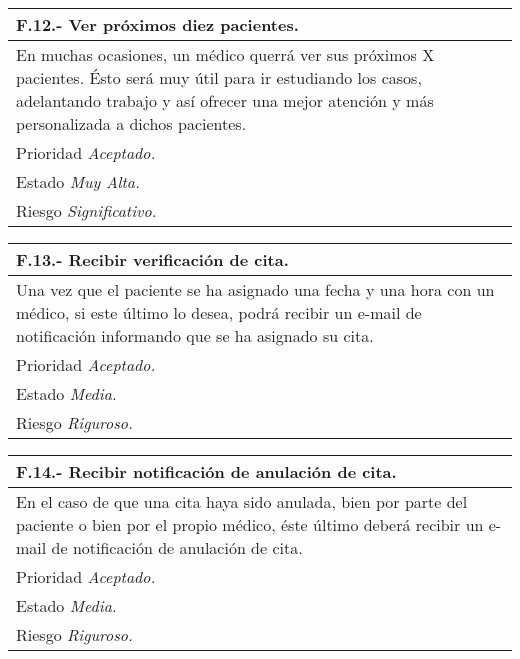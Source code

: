 \documentclass[a4paper,oneside,11pt]{book}
\begin{document}
\begin{center}
\begin{tabulary}{15cm}{|L|}
	\hline
		\bf{F.12.- Ver próximos diez pacientes.} \\
	\hline
		En muchas ocasiones, un médico querrá ver sus próximos X pacientes. Ésto será muy útil para ir estudiando los casos, adelantando trabajo y así ofrecer una mejor atención y más personalizada a dichos pacientes. \\
	\hline
		Prioridad \textit{Aceptado.} \\
	\hline
		Estado \textit{Muy Alta.} \\
	\hline
		Riesgo \textit{Significativo.} \\
	\hline
\end{tabulary}
\end{center}

\begin{center}
\begin{tabulary}{15cm}{|L|}
	\hline
		\bf{F.13.- Recibir verificación de cita.} \\
	\hline
		Una vez que el paciente se ha asignado una fecha y una hora con un médico, si este último lo desea, podrá recibir un e-mail de notificación informando que se ha asignado su cita. \\
	\hline
		Prioridad \textit{Aceptado.} \\
	\hline
		Estado \textit{Media.} \\
	\hline
		Riesgo \textit{Riguroso.} \\
	\hline
\end{tabulary}
\end{center}

\begin{center}
\begin{tabulary}{15cm}{|L|}
	\hline
		\bf{F.14.- Recibir notificación de anulación de cita.} \\
	\hline
		En el caso de que una cita haya sido anulada, bien por parte del paciente o bien por el propio médico, éste último deberá recibir un e-mail de notificación de anulación de cita. \\
	\hline
		Prioridad \textit{Aceptado.} \\
	\hline
		Estado \textit{Media.} \\
	\hline
		Riesgo \textit{Riguroso.} \\
	\hline
\end{tabulary}
\end{center}
\end{document}
